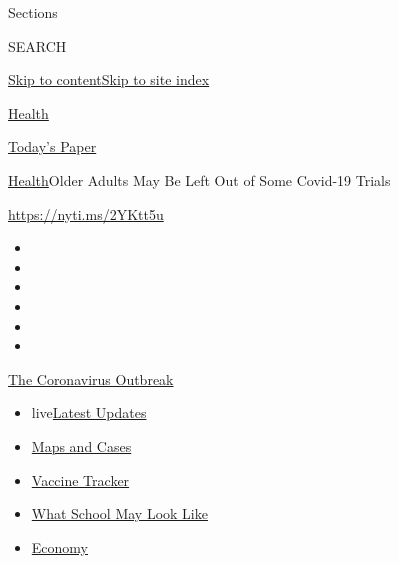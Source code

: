 Sections

SEARCH

\protect\hyperlink{site-content}{Skip to
content}\protect\hyperlink{site-index}{Skip to site index}

\href{https://www.nytimes3xbfgragh.onion/section/health}{Health}

\href{https://myaccount.nytimes3xbfgragh.onion/auth/login?response_type=cookie\&client_id=vi}{}

\href{https://www.nytimes3xbfgragh.onion/section/todayspaper}{Today's
Paper}

\href{/section/health}{Health}\textbar{}Older Adults May Be Left Out of
Some Covid-19 Trials

\url{https://nyti.ms/2YKtt5u}

\begin{itemize}
\item
\item
\item
\item
\item
\item
\end{itemize}

\href{https://www.nytimes3xbfgragh.onion/news-event/coronavirus?action=click\&pgtype=Article\&state=default\&region=TOP_BANNER\&context=storylines_menu}{The
Coronavirus Outbreak}

\begin{itemize}
\tightlist
\item
  live\href{https://www.nytimes3xbfgragh.onion/2020/08/01/world/coronavirus-covid-19.html?action=click\&pgtype=Article\&state=default\&region=TOP_BANNER\&context=storylines_menu}{Latest
  Updates}
\item
  \href{https://www.nytimes3xbfgragh.onion/interactive/2020/us/coronavirus-us-cases.html?action=click\&pgtype=Article\&state=default\&region=TOP_BANNER\&context=storylines_menu}{Maps
  and Cases}
\item
  \href{https://www.nytimes3xbfgragh.onion/interactive/2020/science/coronavirus-vaccine-tracker.html?action=click\&pgtype=Article\&state=default\&region=TOP_BANNER\&context=storylines_menu}{Vaccine
  Tracker}
\item
  \href{https://www.nytimes3xbfgragh.onion/interactive/2020/07/29/us/schools-reopening-coronavirus.html?action=click\&pgtype=Article\&state=default\&region=TOP_BANNER\&context=storylines_menu}{What
  School May Look Like}
\item
  \href{https://www.nytimes3xbfgragh.onion/live/2020/07/31/business/stock-market-today-coronavirus?action=click\&pgtype=Article\&state=default\&region=TOP_BANNER\&context=storylines_menu}{Economy}
\end{itemize}

